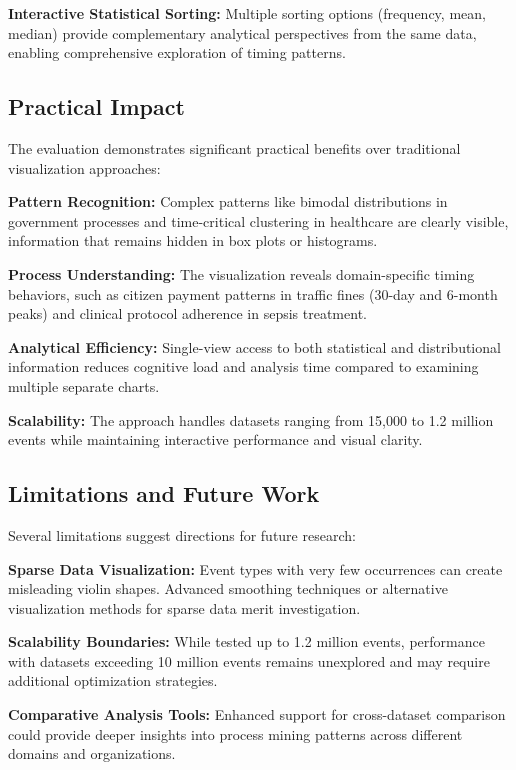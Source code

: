 \textbf{Interactive Statistical Sorting:} Multiple sorting options (frequency, mean, median) provide complementary analytical perspectives from the same data, enabling comprehensive exploration of timing patterns.

\subsection{Practical Impact}
\label{subsec:impact}

The evaluation demonstrates significant practical benefits over traditional visualization approaches:

\textbf{Pattern Recognition:} Complex patterns like bimodal distributions in government processes and time-critical clustering in healthcare are clearly visible, information that remains hidden in box plots or histograms.

\textbf{Process Understanding:} The visualization reveals domain-specific timing behaviors, such as citizen payment patterns in traffic fines (30-day and 6-month peaks) and clinical protocol adherence in sepsis treatment.

\textbf{Analytical Efficiency:} Single-view access to both statistical and distributional information reduces cognitive load and analysis time compared to examining multiple separate charts.

\textbf{Scalability:} The approach handles datasets ranging from 15,000 to 1.2 million events while maintaining interactive performance and visual clarity.

\subsection{Limitations and Future Work}
\label{subsec:future}

Several limitations suggest directions for future research:


\textbf{Sparse Data Visualization:} Event types with very few occurrences can create misleading violin shapes. Advanced smoothing techniques or alternative visualization methods for sparse data merit investigation.

\textbf{Scalability Boundaries:} While tested up to 1.2 million events, performance with datasets exceeding 10 million events remains unexplored and may require additional optimization strategies.

\textbf{Comparative Analysis Tools:} Enhanced support for cross-dataset comparison could provide deeper insights into process mining patterns across different domains and organizations.


